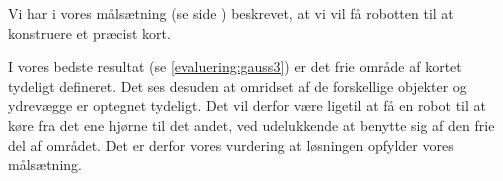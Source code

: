 Vi har i vores målsætning (se side \pageref{problem:maalsaetning}) beskrevet, at vi vil få robotten til at konstruere et præcist kort.



I vores bedste resultat (se \cref{evaluering:gauss3}) er det frie område af kortet tydeligt defineret.
Det ses desuden at omridset af de forskellige objekter og ydrevægge er optegnet tydeligt.
Det vil derfor være ligetil at få en robot til at køre fra det ene hjørne til det andet, ved udelukkende at benytte sig af den frie del af området.
Det er derfor vores vurdering at løsningen opfylder vores målsætning.


